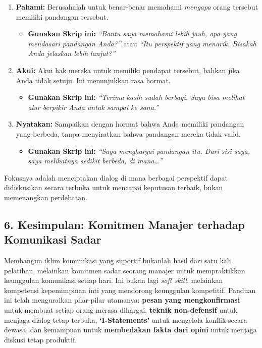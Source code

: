 \documentclass[
  letterpaper,
  DIV=11,
  numbers=noendperiod]{scrreprt}
\providecommand{\tightlist}{%
  \setlength{\itemsep}{0pt}\setlength{\parskip}{0pt}}
\begin{document}
\begin{enumerate}
\def\labelenumi{\arabic{enumi}.}
\item
  \textbf{Pahami:} Berusahalah untuk benar-benar memahami \emph{mengapa}
  orang tersebut memiliki pandangan tersebut.

  \begin{itemize}
  \tightlist
  \item
    \textbf{Gunakan Skrip ini:} \emph{``Bantu saya memahami lebih jauh,
    apa yang mendasari pandangan Anda?''} atau \emph{``Itu perspektif
    yang menarik. Bisakah Anda jelaskan lebih lanjut?''}
  \end{itemize}
\item
  \textbf{Akui:} Akui hak mereka untuk memiliki pendapat tersebut,
  bahkan jika Anda tidak setuju. Ini menunjukkan rasa hormat.

  \begin{itemize}
  \tightlist
  \item
    \textbf{Gunakan Skrip ini:} \emph{``Terima kasih sudah berbagi. Saya
    bisa melihat alur berpikir Anda untuk sampai ke sana.''}
  \end{itemize}
\item
  \textbf{Nyatakan:} Sampaikan dengan hormat bahwa Anda memiliki
  pandangan yang berbeda, tanpa menyiratkan bahwa pandangan mereka tidak
  valid.

  \begin{itemize}
  \tightlist
  \item
    \textbf{Gunakan Skrip ini:} \emph{``Saya menghargai pandangan itu.
    Dari sisi saya, saya melihatnya sedikit berbeda, di mana\ldots{}''}
  \end{itemize}
\end{enumerate}

Fokusnya adalah menciptakan dialog di mana berbagai perspektif dapat
didiskusikan secara terbuka untuk mencapai keputusan terbaik, bukan
memenangkan perdebatan.

\subsection{6. Kesimpulan: Komitmen Manajer terhadap Komunikasi
Sadar}\label{kesimpulan-komitmen-manajer-terhadap-komunikasi-sadar}

Membangun iklim komunikasi yang suportif bukanlah hasil dari satu kali
pelatihan, melainkan komitmen sadar seorang manajer untuk mempraktikkan
keunggulan komunikasi setiap hari. Ini bukan lagi \emph{soft skill},
melainkan kompetensi kepemimpinan inti yang mendorong keunggulan
kompetitif. Panduan ini telah menguraikan pilar-pilar utamanya:
\textbf{pesan yang mengkonfirmasi} untuk membuat setiap orang merasa
dihargai, \textbf{teknik non-defensif} untuk menjaga dialog tetap
terbuka, \textbf{`I-Statements'} untuk mengelola konflik secara dewasa,
dan kemampuan untuk \textbf{membedakan fakta dari opini} untuk menjaga
diskusi tetap produktif.
\end{document}
